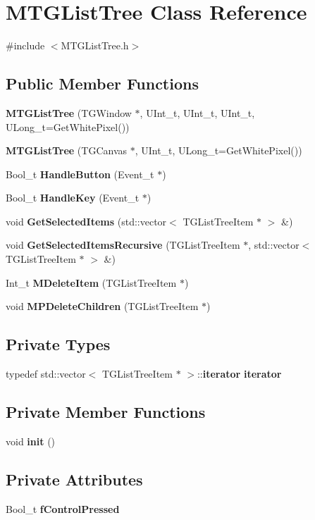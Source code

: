 \section{MTGListTree Class Reference}
\label{classMTGListTree}


{\ttfamily \#include $<$MTGListTree.h$>$}\subsection*{Public Member Functions}
\begin{DoxyCompactItemize}
\item 
{\bf MTGListTree} (TGWindow $\ast$, UInt\_\-t, UInt\_\-t, UInt\_\-t, ULong\_\-t=GetWhitePixel())
\item 
{\bf MTGListTree} (TGCanvas $\ast$, UInt\_\-t, ULong\_\-t=GetWhitePixel())
\item 
Bool\_\-t {\bf HandleButton} (Event\_\-t $\ast$)
\item 
Bool\_\-t {\bf HandleKey} (Event\_\-t $\ast$)
\item 
void {\bf GetSelectedItems} (std::vector$<$ TGListTreeItem $\ast$ $>$ \&)
\item 
void {\bf GetSelectedItemsRecursive} (TGListTreeItem $\ast$, std::vector$<$ TGListTreeItem $\ast$ $>$ \&)
\item 
Int\_\-t {\bf MDeleteItem} (TGListTreeItem $\ast$)
\item 
void {\bf MPDeleteChildren} (TGListTreeItem $\ast$)
\end{DoxyCompactItemize}
\subsection*{Private Types}
\begin{DoxyCompactItemize}
\item 
typedef std::vector$<$ TGListTreeItem $\ast$ $>$::{\bf iterator} {\bf iterator}
\end{DoxyCompactItemize}
\subsection*{Private Member Functions}
\begin{DoxyCompactItemize}
\item 
void {\bf init} ()
\end{DoxyCompactItemize}
\subsection*{Private Attributes}
\begin{DoxyCompactItemize}
\item 
Bool\_\-t {\bf fControlPressed}
\end{DoxyCompactItemize}
